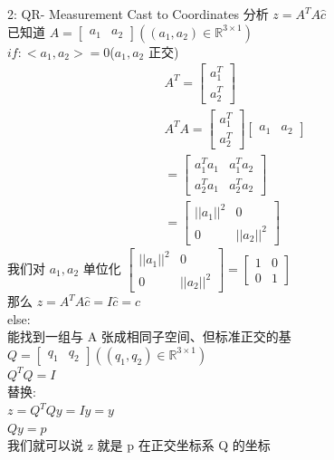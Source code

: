 \documentclass[12pt]{article}
\begin{document}
\begin{flushleft}
    2: QR- Measurement Cast to Coordinates
    分析 $z = A^{T}A\hat{c}$ \\
    已知道 $A = \begin{bmatrix}a_1 & a_2\end{bmatrix} ((a_1,a_2) \in \mathbb{R}^{3 \times 1})$ \\
    $if: <a_1,a_2> = 0$($a_1, a_2$ 正交) \\
    \begin{align}
        A^{T} = \begin{bmatrix}
                    a_1^{T} \\
                    a_2^{T}
                \end{bmatrix}                \\
        A^{T}A = \begin{bmatrix}
                     a_1^{T} \\
                     a_2^{T}
                 \end{bmatrix} \begin{bmatrix}
                                   a_1 & a_2
                               \end{bmatrix} \\
        = \begin{bmatrix}
              a_1^{T}a_1 & a_1^{T}a_2 \\
              a_2^{T}a_1 & a_2^{T}a_2
          \end{bmatrix}             \\
        = \begin{bmatrix}
              ||a_1||^{2} & 0           \\
              0           & ||a_2||^{2}
          \end{bmatrix}
    \end{align}
    我们对 $a_1, a_2$ 单位化
    $ \begin{bmatrix}
            ||a_1||^{2} & 0           \\
            0           & ||a_2||^{2}
        \end{bmatrix}  = \begin{bmatrix}
            1 & 0 \\
            0 & 1
        \end{bmatrix} $ \\
    那么 $z = A^{T}A\hat{c} = I\hat{c} = \hat{c}$ \\
    else: \\
    能找到一组与 A 张成相同子空间、但标准正交的基
    $Q = \begin{bmatrix}q_1 & q_2\end{bmatrix} ((q_1,q_2) \in \mathbb{R}^{3 \times 1})$  \\
    $Q^{T}Q = I$ \\
    替换: \\
    $z = Q^{T}Qy = Iy = y$ \\
    $Qy = p$ \\
    我们就可以说 z 就是 p 在正交坐标系 Q 的坐标


\end{flushleft}
\end{document}
